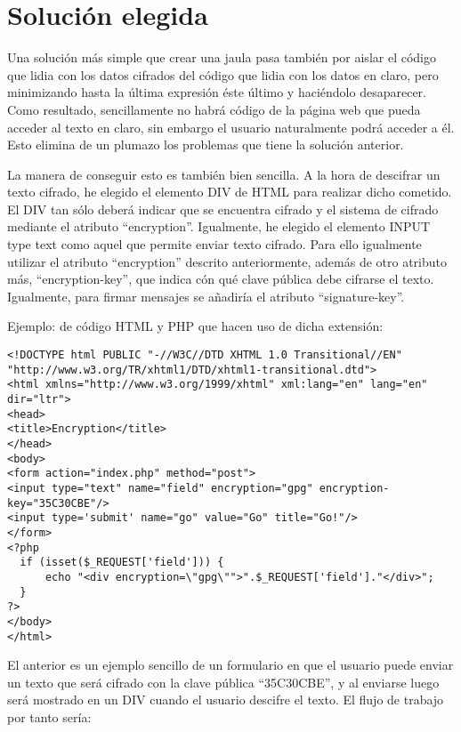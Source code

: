 \section{Solución elegida}\label{solucionelegida}

Una solución más simple que crear una jaula pasa también por aislar el código que lidia con los datos cifrados del código que lidia con los datos en claro, pero minimizando hasta la última expresión éste último y haciéndolo desaparecer. Como resultado, sencillamente no habrá código de la página web que pueda acceder al texto en claro, sin embargo el usuario naturalmente podrá acceder a él. Esto elimina de un plumazo los problemas que tiene la solución anterior.

La manera de conseguir esto es también bien sencilla. A la hora de descifrar un texto cifrado, he elegido el elemento DIV de HTML para realizar dicho cometido. El DIV tan sólo deberá indicar que se encuentra cifrado y el sistema de cifrado mediante el atributo ``encryption''. Igualmente, he elegido el elemento INPUT type text como aquel que permite enviar texto cifrado. Para ello igualmente utilizar el atributo ``encryption'' descrito anteriormente, además de otro atributo más, ``encryption-key'', que indica cón qué clave pública debe cifrarse el texto. Igualmente, para firmar mensajes se añadiría el atributo ``signature-key''.

Ejemplo: de código HTML y PHP que hacen uso de dicha extensión:

\begin{verbatim}
<!DOCTYPE html PUBLIC "-//W3C//DTD XHTML 1.0 Transitional//EN" "http://www.w3.org/TR/xhtml1/DTD/xhtml1-transitional.dtd">
<html xmlns="http://www.w3.org/1999/xhtml" xml:lang="en" lang="en" dir="ltr">
<head>
<title>Encryption</title>
</head>
<body>
<form action="index.php" method="post">
<input type="text" name="field" encryption="gpg" encryption-key="35C30CBE"/>
<input type='submit' name="go" value="Go" title="Go!"/>
</form>
<?php
  if (isset($_REQUEST['field'])) {
      echo "<div encryption=\"gpg\"">".$_REQUEST['field']."</div>";
  }
?>
</body>
</html>
\end{verbatim} 

El anterior es un ejemplo sencillo de un formulario en que el usuario puede enviar un texto que será cifrado con la clave pública ``35C30CBE'', y al enviarse luego será mostrado en un DIV cuando el usuario descifre el texto. El flujo de trabajo por tanto sería:

